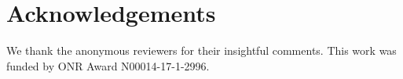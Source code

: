 \section*{Acknowledgements}
\label{sec:ack}

We thank the anonymous reviewers for their insightful comments.  This work was funded
by ONR Award N00014-17-1-2996.
